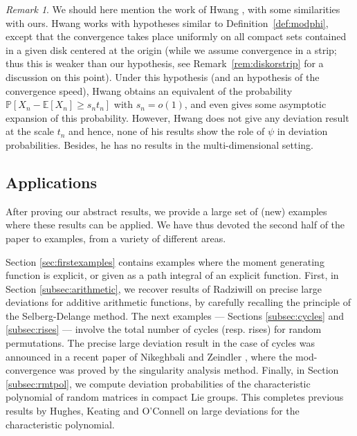 \documentclass[12pt,a4paper,reqno]{amsart}
\theoremstyle{remark}
\newtheorem{remark}[lemma]{Remark}
\newcommand{\esper}{\mathbb{E}}
\newcommand{\proba}{\mathbb{P}}
\begin{document}
\begin{remark}
    \label{rem:hwang}
    We should here mention the work of Hwang \cite{Hwa96}, with some similarities with ours. Hwang works with hypotheses similar to Definition~\ref{def:modphi}, except that the convergence takes place uniformly on all compact sets contained in a given disk centered at the origin (while we assume convergence in a strip; thus this is weaker than our hypothesis, see Remark~\ref{rem:diskorstrip} for a discussion on this point).
    Under this hypothesis (and an hypothesis of the convergence speed), Hwang obtains an equivalent of the probability $\proba[X_n -\esper[X_n] \ge s_n t_n]$ with $s_n=o(1)$, and even gives some asymptotic expansion of this probability. However, Hwang does not give any deviation result at the scale $t_n$ and hence, none of his results show the role of $\psi$ in deviation probabilities. Besides, he has no results in the multi-dimensional setting.
\end{remark}
\bigskip



\subsection{Applications}\label{subsec:applications}
After proving our abstract results, we provide a large set of (new) examples where these results can be applied. 
We have thus devoted the second half of the paper to examples, from a variety of different areas.\bigskip

Section \ref{sec:firstexamples} contains examples where the moment generating function is explicit,
or given as a path integral of an explicit function.
%
%
First, in Section \ref{subsec:arithmetic},
we recover results of Radziwill \cite{Rad09} on precise large deviations for additive arithmetic functions,
by carefully recalling the principle of the Selberg-Delange method.
The next examples --- Sections \ref{subsec:cycles} and \ref{subsec:rises} --- involve the total number of cycles (resp. rises) for random permutations.
The precise large deviation result in the case of cycles was announced in a recent paper of Nikeghbali and Zeindler \cite{NZ13},
where the mod-convergence was proved by the singularity analysis method.
Finally, in Section \ref{subsec:rmtpol}, we compute deviation probabilities of the characteristic polynomial of random matrices in compact Lie groups.
This completes previous results by Hughes, Keating and O'Connell \cite{HKO01} on large deviations for the characteristic polynomial.
\medskip 
\end{document}
